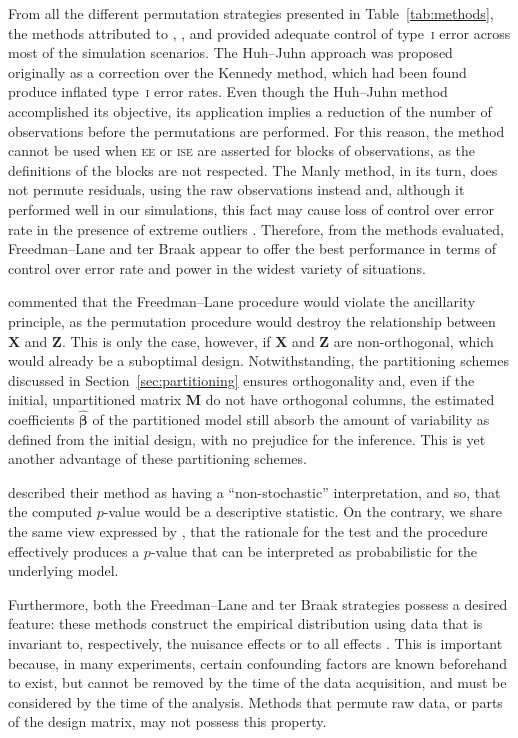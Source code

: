 From all the different permutation strategies presented in Table~\ref{tab:methods}, the methods attributed to \citet{Freedman1983}, \citet{TerBraak1992}, \citet{Manly1997} and \citet{Huh2001} provided adequate control of type~\textsc{i} error across most of the simulation scenarios. The Huh--Juhn approach was proposed originally as a correction over the Kennedy method, which had been found produce inflated type~\textsc{i} error rates. Even though the Huh--Juhn method accomplished its objective, its application implies a reduction of the number of observations before the permutations are performed. For this reason, the method cannot be used when \textsc{ee} or \textsc{ise} are asserted for blocks of observations, as the definitions of the blocks are not respected. The Manly method, in its turn, does not permute residuals, using the raw observations instead and, although it performed well in our simulations, this fact may cause loss of control over error rate in the presence of extreme outliers \citep{Anderson2001}. Therefore, from the methods evaluated, Freedman--Lane and ter Braak appear to offer the best performance in terms of control over error rate and power in the widest variety of situations.

\citet{Welch1990} commented that the Freedman--Lane procedure would violate the ancillarity principle, as the permutation procedure would destroy the relationship between $\mathbf{X}$ and $\mathbf{Z}$. This is only the case, however, if $\mathbf{X}$ and $\mathbf{Z}$ are non-orthogonal, which would already be a suboptimal design. Notwithstanding, the partitioning schemes discussed in Section~\ref{sec:partitioning} ensures orthogonality and, even if the initial, unpartitioned matrix $\mathbf{M}$ do not have orthogonal columns, the estimated coefficients $\boldsymbol{\hat{\beta}}$ of the partitioned model still absorb the amount of variability as defined from the initial design, with no prejudice for the inference. This is yet another advantage of these partitioning schemes.

\citet{Freedman1983} described their method as having a ``non-stochastic'' interpretation, and so, that the computed $p$-value would be a descriptive statistic. On the contrary, we share the same view expressed by \citet{Anderson1999}, that the rationale for the test and the procedure effectively produces a $p$-value that can be interpreted as probabilistic for the underlying model.

Furthermore, both the Freedman--Lane and ter Braak strategies possess a desired feature: these methods construct the empirical distribution using data that is invariant to, respectively, the nuisance effects or to all effects \citep{Welch1990}. This is important because, in many experiments, certain confounding factors are known beforehand to exist, but cannot be removed by the time of the data acquisition, and must be considered by the time of the analysis. Methods that permute raw data, or parts of the design matrix, may not possess this property.


